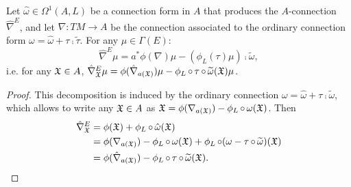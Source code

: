 \begin{proposition}\label{propositionDecompositionFormActionMatterAConnection}
Let $\hat \omega \in \Omega^1(A, L)$ be a connection form in $A$ that produces the $A$-connection $\hat \nabla^E$, and let $\nabla: TM \to A$ be the connection associated to the ordinary connection form $\omega = \hat \omega + \tau \comp \tilde \tau$. For any $\mu \in \Gamma(E)$:
\begin{equation}
    \hat \nabla^E \mu = a^* \phi(\nabla)\mu - (\phi_L(\tau) \mu)\comp \tilde \omega,
\end{equation}
i.e. for any $\mathfrak{X} \in A$, $\hat \nabla^E_{\oid X} \mu = \phi(\hat \nabla_{a(\oid X)})\mu - \phi_L \comp \tau \comp \tilde \omega(\oid X) \mu$.
\end{proposition}
\begin{proof}
This decomposition is induced by the ordinary connection $\omega = \hat \omega + \tau \comp \tilde \omega$, which allows to write any $\mathfrak{X} \in A$ as $\oid X = \phi(\nabla_{a(\oid X)}) - \phi_L \comp \omega(\oid X)$. Then 
\begin{align*}
    \hat \nabla^E_{\oid X} 
      &= \phi(\oid X) + \phi_L \comp \hat \omega(\oid X)\\
      &= \phi(\nabla_{a(\oid X)}) - \phi_L \comp \omega(\oid X) + \phi_L \comp (\omega - \tau \comp \tilde \omega)(\oid X)\\
      &= \phi(\hat \nabla_{a(\oid X)}) - \phi_L \comp \tau \comp \tilde \omega(\oid X).
\end{align*}
\end{proof}

